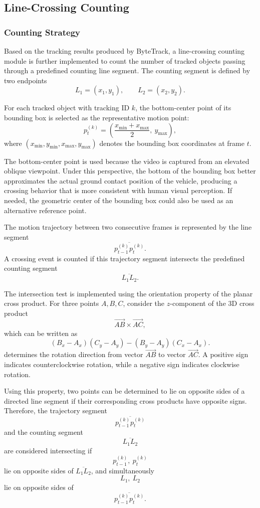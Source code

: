 \subsection{Line-Crossing Counting}

\subsubsection{Counting Strategy}

Based on the tracking results produced by ByteTrack, a line-crossing counting module is further implemented to count the number of tracked objects passing through a predefined counting line segment. The counting segment is defined by two endpoints
\[
L_1=(x_1,y_1), \qquad L_2=(x_2,y_2).
\]

For each tracked object with tracking ID \(k\), the bottom-center point of its bounding box is selected as the representative motion point:
\[
p_t^{(k)} = \left( \frac{x_{\min}+x_{\max}}{2},\ y_{\max} \right),
\]
where \((x_{\min}, y_{\min}, x_{\max}, y_{\max})\) denotes the bounding box coordinates at frame \(t\).

The bottom-center point is used because the video is captured from an elevated oblique viewpoint. Under this perspective, the bottom of the bounding box better approximates the actual ground contact position of the vehicle, producing a crossing behavior that is more consistent with human visual perception. If needed, the geometric center of the bounding box could also be used as an alternative reference point.

The motion trajectory between two consecutive frames is represented by the line segment
\[
\overline{p_{t-1}^{(k)} p_t^{(k)}}.
\]
A crossing event is counted if this trajectory segment intersects the predefined counting segment
\[
\overline{L_1L_2}.
\]

The intersection test is implemented using the orientation property of the planar cross product. For three points \(A,B,C\), consider the \(z\)-component of the 3D cross product
\[
\overrightarrow{AB}\times\overrightarrow{AC},
\]
which can be written as
\[
(B_x-A_x)(C_y-A_y)
-
(B_y-A_y)(C_x-A_x).
\]
determines the rotation direction from vector \(\overrightarrow{AB}\) to vector \(\overrightarrow{AC}\). A positive sign indicates counterclockwise rotation, while a negative sign indicates clockwise rotation.

Using this property, two points can be determined to lie on opposite sides of a directed line segment if their corresponding cross products have opposite signs. Therefore, the trajectory segment
\[
\overline{p_{t-1}^{(k)} p_t^{(k)}}
\]
and the counting segment
\[
\overline{L_1L_2}
\]
are considered intersecting if
\[
p_{t-1}^{(k)},\ p_t^{(k)}
\]
lie on opposite sides of \(\overline{L_1L_2}\), and simultaneously
\[
L_1,\ L_2
\]
lie on opposite sides of
\[
\overline{p_{t-1}^{(k)} p_t^{(k)}}.
\]


